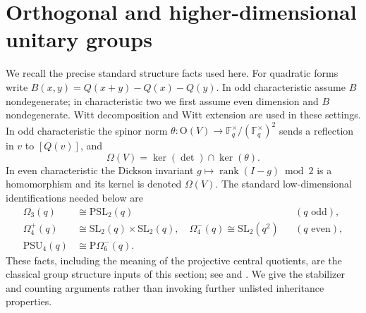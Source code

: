 \documentclass[11pt]{article}
\theoremstyle{definition}
\newcommand{\F}{\mathbb F}
\newcommand{\SL}{\mathrm{SL}}
\newcommand{\PSL}{\mathrm{PSL}}
\newcommand{\PSU}{\mathrm{PSU}}
\newcommand{\Ogrp}{\mathrm O}
\newcommand{\rank}{\operatorname{rank}}
\begin{document}
\section{Orthogonal and higher-dimensional unitary groups}\label{sec:classical}
We recall the precise standard structure facts used here. For quadratic forms write $B(x,y)=Q(x+y)-Q(x)-Q(y)$. In odd characteristic assume $B$ nondegenerate; in characteristic two we first assume even dimension and $B$ nondegenerate. Witt decomposition and Witt extension are used in these settings. In odd characteristic the spinor norm $\theta:\Ogrp(V)\to\F_q^\times/(\F_q^\times)^2$ sends a reflection in $v$ to $[Q(v)]$, and
\[
\Omega(V)=\ker(\det)\cap\ker(\theta).
\]
In even characteristic the Dickson invariant $g\mapsto\rank(I-g)\bmod2$ is a homomorphism and its kernel is denoted $\Omega(V)$. The standard low-dimensional identifications needed below are
\begin{align*}
\Omega_3(q)&\cong\PSL_2(q) &&(q\text{ odd}),\\
\Omega_4^+(q)&\cong\SL_2(q)\times\SL_2(q),\quad
\Omega_4^-(q)\cong\SL_2(q^2) &&(q\text{ even}),\\
\PSU_4(q)&\cong\mathrm P\Omega_6^-(q).
\end{align*}
These facts, including the meaning of the projective central quotients, are the classical group structure inputs of this section; see \cite[Chapters 7--12]{Taylor} and \cite[Sections 6--7]{Cameron}. We give the stabilizer and counting arguments rather than invoking further unlisted inheritance properties.
\end{document}
